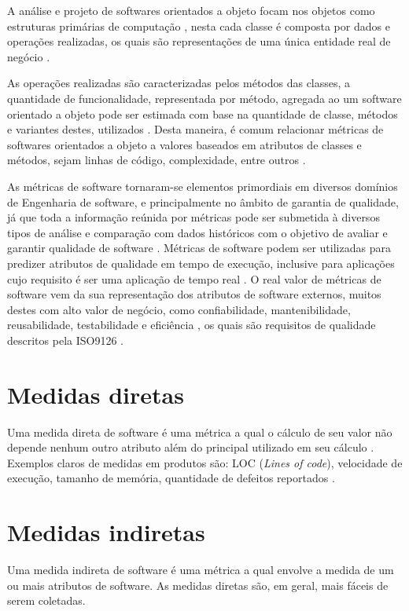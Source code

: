 \documentclass[
	12pt,				%
	oneside,			%
	a4paper,			%
	english,			%
	brazil				%
	]{abntex2ppgsi}
\begin{document}
A análise e projeto de softwares orientados a objeto focam nos objetos como estruturas primárias de computação \cite{kan95} \cite{srivastava2013}, nesta cada classe é composta por dados e operações realizadas, os quais  são representações de uma única entidade real de negócio \cite{srivastava2013}.

As operações realizadas são caracterizadas pelos métodos das classes, a quantidade de funcionalidade, representada por método, agregada ao um software orientado a objeto pode ser estimada com base na quantidade de classe, métodos e variantes destes, utilizados \cite{kan95}. Desta maneira, é comum relacionar métricas de softwares orientados a objeto a valores baseados em atributos de classes e métodos, sejam linhas de código, complexidade, entre outros \cite{kan95}.

As métricas de software tornaram-se elementos primordiais em diversos domínios de Engenharia de software, e principalmente no âmbito de garantia de qualidade, já que toda a informação reúnida por métricas pode ser submetida à diversos tipos de análise e comparação com dados históricos com o objetivo de avaliar e garantir qualidade de software \cite{srivastava2013}. Métricas de software podem ser utilizadas para predizer atributos de qualidade em tempo de execução, inclusive para aplicações cujo requisito é ser uma aplicação de tempo real \cite{srivastava2013}. O real valor de métricas de software vem da sua representação dos atributos de software externos, muitos destes com alto valor de negócio, como confiabilidade, mantenibilidade, reusabilidade, testabilidade e eficiência \cite{srivastava2013}, os quais são requisitos de qualidade descritos pela ISO9126 \cite{Zeiss2007}.






\section{Medidas diretas}
Uma medida direta de software é uma métrica a qual o cálculo de seu valor não depende nenhum outro atributo além do principal utilizado em seu cálculo \cite{srivastava2013}. Exemplos claros de medidas em produtos são: LOC (\textit{Lines of code}), velocidade de execução, tamanho de memória, quantidade de defeitos reportados \cite{srivastava2013}.


\section{Medidas indiretas}
Uma medida indireta de software é uma métrica a qual envolve a medida de um ou mais atributos de software\cite{srivastava2013}. As medidas diretas são, em geral, mais fáceis de serem coletadas.
\end{document}
